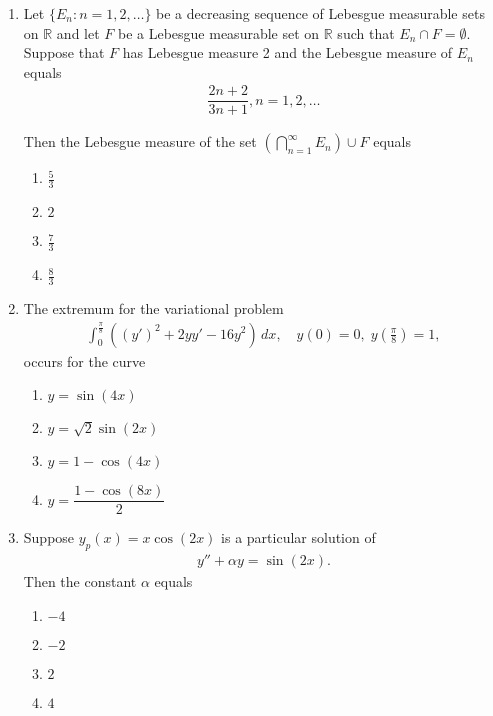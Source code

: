\documentclass[journal]{IEEEtran}
\numberwithin{equation}{enumi}
\numberwithin{figure}{enumi}
\begin{document}
\begin{enumerate}
\item  Let $\{E_n : n = 1, 2, \dots\}$ be a decreasing sequence of Lebesgue measurable sets on $\mathbb{R}$ and let $F$ be a Lebesgue measurable set on $\mathbb{R}$ such that $E_n \cap F = \emptyset$. Suppose that $F$ has Lebesgue measure 2 and the Lebesgue measure of $E_n$ equals \begin{align*}
    \dfrac{2n + 2}{3n + 1}, n = 1, 2, \dots
\end{align*}

Then the Lebesgue measure of the set $\left(\bigcap_{n=1}^{\infty} E_n\right) \cup F$ equals
\hfill{}

\begin{multicols}{4}
\begin{enumerate}
    \item $\tfrac{5}{3}$
    \item $2$
    \item $\tfrac{7}{3}$
    \item $\tfrac{8}{3}$
\end{enumerate}
\end{multicols}


\item The extremum for the variational problem
\begin{align*}
\int_0^{\frac{\pi}{8}} ((y')^2 + 2yy' - 16y^2) \, dx, \quad y(0) = 0, \; y\left(\frac{\pi}{8}\right) = 1,
\end{align*}
occurs for the curve
\hfill{}

\begin{enumerate}
 \item  $y = \sin(4x)$
 \item  $y = \sqrt{2} \sin(2x)$
 \item $y = 1 - \cos(4x)$ 
 \item $y = \dfrac{1 - \cos(8x)}{2}$
\end{enumerate}


\item Suppose $y_p(x) = x \cos(2x)$ is a particular solution of 
\begin{align*}
y'' + \alpha y = \sin(2x).
\end{align*}
Then the constant $\alpha$ equals \hfill{}
\begin{multicols}{4}
\begin{enumerate}
    \item $-4$
    \item $-2$
    \item $2$
    \item $4$
\end{enumerate}
\end{multicols}



\end{enumerate}
\end{document}

